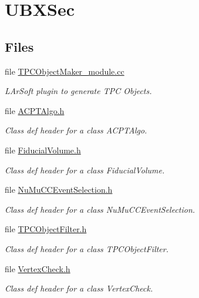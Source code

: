 \hypertarget{group__UBXSec}{\section{U\-B\-X\-Sec}
\label{group__UBXSec}
}
\subsection*{Files}
\begin{DoxyCompactItemize}
\item 
file \hyperlink{TPCObjectMaker__module_8cc}{T\-P\-C\-Object\-Maker\-\_\-module.\-cc}
\begin{DoxyCompactList}\small\item\em L\-Ar\-Soft plugin to generate T\-P\-C Objects. \end{DoxyCompactList}\item 
file \hyperlink{ACPTAlgo_8h}{A\-C\-P\-T\-Algo.\-h}
\begin{DoxyCompactList}\small\item\em Class def header for a class A\-C\-P\-T\-Algo. \end{DoxyCompactList}\item 
file \hyperlink{FiducialVolume_8h}{Fiducial\-Volume.\-h}
\begin{DoxyCompactList}\small\item\em Class def header for a class Fiducial\-Volume. \end{DoxyCompactList}\item 
file \hyperlink{NuMuCCEventSelection_8h}{Nu\-Mu\-C\-C\-Event\-Selection.\-h}
\begin{DoxyCompactList}\small\item\em Class def header for a class Nu\-Mu\-C\-C\-Event\-Selection. \end{DoxyCompactList}\item 
file \hyperlink{TPCObjectFilter_8h}{T\-P\-C\-Object\-Filter.\-h}
\begin{DoxyCompactList}\small\item\em Class def header for a class T\-P\-C\-Object\-Filter. \end{DoxyCompactList}\item 
file \hyperlink{VertexCheck_8h}{Vertex\-Check.\-h}
\begin{DoxyCompactList}\small\item\em Class def header for a class Vertex\-Check. \end{DoxyCompactList}\end{DoxyCompactItemize}
